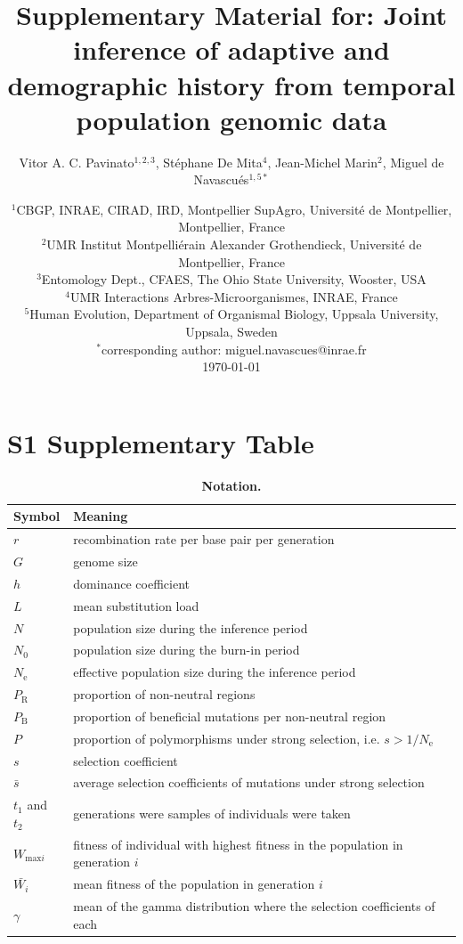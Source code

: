 \documentclass[a4paper, 12pt]{article}
\title{Supplementary Material for: Joint inference of adaptive and demographic history from temporal population genomic data}
\author{\small
            Vitor A. C. Pavinato$^{1,2,3}$, Stéphane De Mita$^4$, Jean-Michel Marin$^2$, Miguel de Navascués$^{1,5*}$}
\date{{\footnotesize %
    $^1$CBGP, INRAE, CIRAD, IRD, Montpellier SupAgro, Université de Montpellier, Montpellier, France\\%
    $^2$UMR Institut Montpelliérain Alexander Grothendieck, Université de Montpellier, France\\%
    $^3$Entomology Dept., CFAES, The Ohio State University, Wooster, USA\\%
    $^4$UMR Interactions Arbres-Microorganismes, INRAE, France \\%
    $^5$Human Evolution, Department of Organismal Biology, Uppsala University, Uppsala, Sweden\\%
    $^*$corresponding author: miguel.navascues@inrae.fr\\[2ex]%
    }
    \footnotesize\today    
}
\begin{document}
\maketitle

\newpage

\section*{S1 Supplementary Table}

\begin{table}[ht]
 \caption{\textbf{Notation.}}
  \label{table:tableS1}
  \begin{tabular}{ll}
   \cmidrule(r){1-2}
    Symbol                  & Meaning \\
    \midrule
    $r$        & recombination rate per base pair per generation \\
    $G$                     & genome size\\
    $h$                     & dominance coefficient\\
    $L$                     & mean substitution load\\
    $N$                     & population size during the inference period\\ 
    $N_{\mathrm{0}}$        & population size during the burn-in period\\
    $N_{\mathrm{e}}$        & effective population size during the inference period\\
    $P_{\mathrm{R}}$        & proportion of non-neutral regions\\
    $P_{\mathrm{B}}$        & proportion of beneficial mutations per non-neutral region\\
    $P$                     & proportion of polymorphisms under strong selection, i.e. $s > 1/ N_{\mathrm{e}}$\\
    $s$                     & selection coefficient\\
    $\bar{s}$               & average selection coefficients of mutations under strong selection\\
    $t_1$ and $t_2$         & generations were samples of individuals were taken\\
    $W_{\mathrm{max}i}$     & fitness of individual with highest fitness in the population in generation $i$\\
    $\bar{W_{i}}$           & mean fitness of the population in generation $i$\\
    $\gamma$                & mean of the gamma distribution where the selection coefficients of each\\

\end{tabular}
\end{table}
\end{document}
